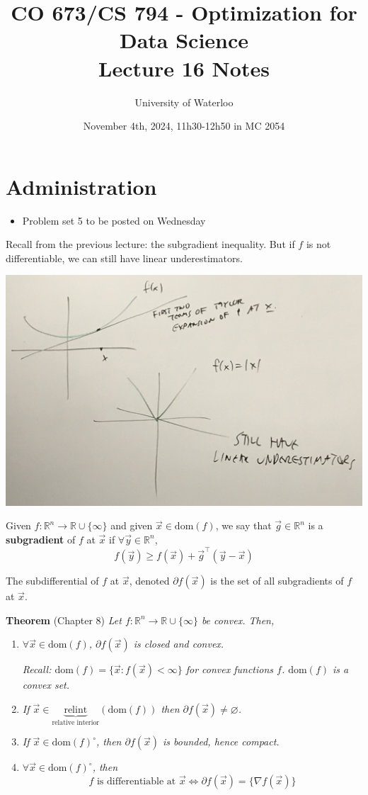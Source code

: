 \documentclass{article}
\title{CO 673/CS 794 - Optimization for Data Science\\Lecture 16 Notes}
\author{University of Waterloo}
\date{November 4th, 2024, 11h30-12h50 in MC 2054}
\newcommand{\R}{\mathbb{R}}             %
\newcommand{\x}{\vec{x}}
\newcommand{\dom}{\text{dom}}           %
\newcommand{\relint}{\text{relint}}     %
\begin{document}
\maketitle

\section{Administration}

\begin{itemize}
    \item Problem set 5 to be posted on Wednesday
\end{itemize}

Recall from the previous lecture: the subgradient inequality. But if $f$ is not differentiable, we can still have linear underestimators.

\begin{center}
    \includegraphics[scale=0.1]{subgrad_ineq.JPG}
\end{center}

Given $f \colon \R^n \to \R \cup \{\infty\}$ and given $\x \in \dom(f)$, we say that $\vec{g} \in \R^n$ is a \textbf{subgradient} of $f$ at $\x$ if $\forall \vec{y} \in \R^n$,
\[
    f(\vec{y}) \geq f(\x) + \vec{g}^\top(\vec{y} - \x)
\]

The subdifferential of $f$ at $\x$, denoted $\partial f(\x)$ is the set of all subgradients of $f$ at $\x$.

\textbf{Theorem} (Chapter 8) \textit{Let $f \colon \R^n \to \R \cup \{\infty\}$ be convex. Then,}
\begin{enumerate}
    \item \textit{$\forall \x \in \dom(f)$, $\partial f(\x)$ is closed and convex.}

    \textit{Recall: $\dom(f) = \{\x : f(\x) < \infty\}$ for convex functions $f$. $\dom(f)$ is a convex set.}

    \item \textit{If $\x \in \underbrace{\relint}_{\text{relative interior}}(\dom(f))$ then $\partial f(\x) \neq \varnothing$.}
    \item \textit{If $\x \in \dom(f)^\circ$, then $\partial f(\x)$ is bounded, hence compact.}
    \item \textit{$\forall \x \in \dom(f)^\circ$, then
    \[
        f \text{ is differentiable at } \x \iff \partial f(\x) = \{\nabla f(\x)\}
    \]}
\end{enumerate}
\end{document}
